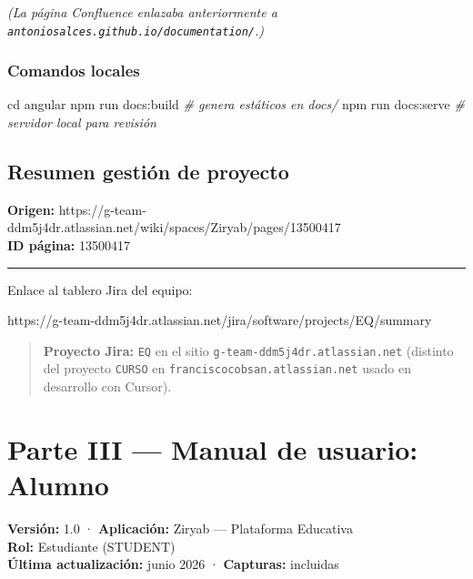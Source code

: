 \documentclass[
  spanish,
  11pt,
]{report}
\newenvironment{Shaded}{}{}
\newcommand{\BuiltInTok}[1]{\textcolor[rgb]{0.00,0.50,0.00}{#1}}
\newcommand{\CommentTok}[1]{\textcolor[rgb]{0.38,0.63,0.69}{\textit{#1}}}
\newcommand{\ExtensionTok}[1]{#1}
\newcommand{\NormalTok}[1]{#1}
\begin{document}
\emph{(La página Confluence enlazaba anteriormente a
\texttt{antoniosalces.github.io/documentation/}.)}

\subsection{Comandos locales}\label{comandos-locales}

\begin{Shaded}
\begin{Highlighting}[]
\BuiltInTok{cd}\NormalTok{ angular}
\ExtensionTok{npm}\NormalTok{ run docs:build    }\CommentTok{\# genera estáticos en docs/}
\ExtensionTok{npm}\NormalTok{ run docs:serve    }\CommentTok{\# servidor local para revisión}
\end{Highlighting}
\end{Shaded}

\section{Resumen gestión de
proyecto}\label{resumen-gestiuxf3n-de-proyecto}

\textbf{Origen:}
https://g-team-ddm5j4dr.atlassian.net/wiki/spaces/Ziryab/pages/13500417\\
\textbf{ID página:} 13500417

\begin{center}\rule{0.5\linewidth}{0.5pt}\end{center}

Enlace al tablero Jira del equipo:

https://g-team-ddm5j4dr.atlassian.net/jira/software/projects/EQ/summary

\begin{quote}
\textbf{Proyecto Jira:} \texttt{EQ} en el sitio
\texttt{g-team-ddm5j4dr.atlassian.net} (distinto del proyecto
\texttt{CURSO} en \texttt{franciscocobsan.atlassian.net} usado en
desarrollo con Cursor).
\end{quote}

\newpage

\chapter{Parte III --- Manual de usuario:
Alumno}\label{parte-iii-manual-de-usuario-alumno}

\textbf{Versión:} 1.0 · \textbf{Aplicación:} Ziryab --- Plataforma
Educativa\\
\textbf{Rol:} Estudiante (STUDENT)\\
\textbf{Última actualización:} junio 2026 · \textbf{Capturas:} incluidas
\end{document}
